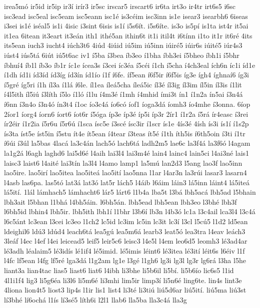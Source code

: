 {irea5mó
ir5id
ir5ip
ir3í
irír3
ir5sc
irscar5
irscart6
ir6ta
irt3o
ir4tr
irt6s5
i6sc
isc3ead
isc5eal
isc5eam
isc5eann
isc1é
is3céim
isc3inn
is1e
isear3
isearbh6
6iseas
i3sei
is1é
iséal5
is1i
4isic
i3sint
6isis
is1í
i5s6ít.
i5s6íte.
is3o
is5pí
is1ta
ist4r
it5ai
it1ea
6itean
it3eart
it3eán
ith1
ithé5an
ithin6t
it1i
itil4t
i6tínn
i1to
it1r
it6ré
4its
its5ean
iuch3
iucht4
iúch3t6
4iúd
4iúid
iú5im
iú5inn
iúiré5
iúir6s
iúité5
iúr4s3
iúst4
iús5tá
6iút
iú5t6ac
iv1
í5ba
í3bea
íb3eo
í1bha
íbh3ei
í5bheo
íbh1i
í5bhr
íbhuí4
íb1l
íb3o
íb1r
íc1e
ícea3s
í3cei
íc3éa
í5céi
í1ch
í5cha
í4ch3eal
ích6n
íc1i
íd1e
í1dh
íd1i
íd3íd
íd3íg
íd3ín
íd1ío
í1f
í6fe.
íf5ean
í6f5ir
í6f5is
íg3e
ígh4
íghnaí6
íg3i
í5gré
íg5ri
í1h
íl3a
í1lá
í6le.
íl1ea
íleá5cha
íleá5ic
íl3é
íl3ig
íl3im
íl5in
íl3is
í1lit
í4l5ith
íl5iú
í3líth
í5lo
í1ló
í1lu
í4m3é
í1mh
í4mhid
ími3t
ín1
í1n2a
ín5ai
í3n4á
í6nn
í3n4o
í3n4ó
ín3t4
í1oc
ío3c4á
ío6có
íof1
íoga3dá
íomh3
ío4mhe
í3onna.
6íop
2íor1
íorg4
íorn6
íort6
íot6r
í5óga
íp3e
íp3é
íp5i
íp3r
2ír1
í1r2a
í5rá
ír4easc
í3rei
ír2éir
í1r2ia
í5r6u
í5r6ú
í1sca
ísc5e
í3scé
ísc3ir
í1scr
ís1e
4ís3é
4ísh
ís3i
ís1í
í1s2p
ís3ta
íst5e
íst5in
í5stu
ít4e
ít5ean
í4tear
í3teas
ít5é
í1th
íth5is
í6th5oin
í3ti
í1tr
í6úi
í3úl
la5bas
4lacá
la3c4án
lach5ó
lach6tá
ladh2m5
lae6c
la3f4á
la3f6ó
l4agam
la1g2á
l6agh
laghd6
lai5d6é
l4aih
lai3l4
lai3m4é
lain4
lainc4
lain5ci
l4ai3né
lais1
laisc3
laist6
l4aité
lai3tín
la3l4
l4amo
lamp1
la5mú
lan2d3
l5ang
lao3f
lao5inn
lao5ire.
lao5irí
lao5itea
lao5iteá
lao5ití
lao5nna
l1ar
l4ar3n
la3rúi
lasar3
lasarn4
l4asb
las6pa.
las5tó
lat3á
lat3ó
lat5r
lách5
l4áib
l6áim
láin3
lá5inn
láint4
lá5iteá
lá5ití.
1lál
lámhach5
lámhacht6
lár5
lárt6
l1b4a
lba5t
l3bá
lbh5acá
lbh5ad
l5bhain
lbh3ait
l5bhan
l1bhá
l4bh5áin.
l6bh5án.
lbh5ead
lbh5ean
lbh3eo
l3bhé
lbh3f
l6bh5id
lbhin4
lbh5ir.
lbh5ith
lbh1í
l1bhr
l3b6í
lb3n
l4b3ó
lc1a
l3c4ail
lca3l4
l3c4á
l6c5ánt
lc3ean
l3cei
lc3eo
l1ch2
lc5id
lc3im
lc5in
lc3it
lc3í
l3cl
l5cú5
l1d2
ld5ean
ldeighil6
ldú3
ldúd4
leach6tá
lea5gú
lea5m6á
learb3
leat5ó
lea3tra
l4eav
leách3
3leáf
l4ec
l4ef
l4ei
leicead5
leif5
leir5c6
leisc3
l4e5l
l4em
leo6d5
leomh3
lé3ad4ar
lé3adh
léalaim5
lé3idís
lé1if4
lé5imid.
lé5imis
léint6
lé3itea
lé3ití
léit6s
l6éiv
l1f
l4fc
lf5ean
l4fg
lf5ré
lga3dá
l1g2am
lg1e
l3gé
l1gh6
lg3i
lg3l
lg3r
lg6rá
l3ha
l5he
liant3a
lian4tac
lias5
liast6
liat6
l4ibh
li3bhe
li5b6il
li5bí.
li5b6ío
lic6s5
l1id
4l1i1f4
lig3
li5g6éa
li3l6
li5m6é
li3mhi
lim5ir
limp3í
li5n6é
ling6te.
lin4s
lint3e
4liona
lion4t5
liost3
lip4s
l1ir
lis1
list4
li3té
li3tiú
liú5d6ar
liú5ití.
liú5ma
liú3st
lí3bhé
lí6ochá
l1ís
lí3sé5
líth6i
l2l1
llab6
lla5ba
lla3c4á
lla3g
}
